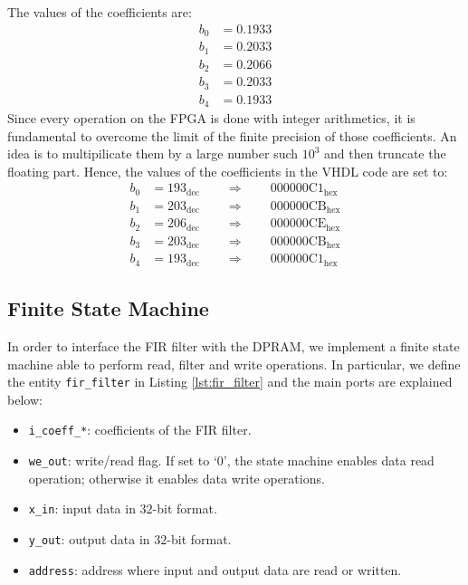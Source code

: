 \documentclass[11pt, a4paper]{article}
\begin{document}
The values of the coefficients are:
\begin{align*}
    b_0 &= 0.1933  \\
    b_1 &= 0.2033  \\
    b_2 &= 0.2066  \\
    b_3 &= 0.2033  \\
    b_4 &= 0.1933
\end{align*}
Since every operation on the FPGA is done with integer arithmetics, it is fundamental to overcome the limit of the finite precision of those coefficients. An idea is to multipilicate them by a large number such $10^3$ and then truncate the floating part. Hence, the values of the coefficients in the VHDL code are set to:
\begin{align*}
    b_0 &= \mathrm{193}_{\text{dec}}  \qquad \Longrightarrow \qquad \mathrm{000000C1}_{\text{hex}}   \\
    b_1 &= \mathrm{203}_{\text{dec}}  \qquad \Longrightarrow \qquad \mathrm{000000CB}_{\text{hex}}   \\
    b_2 &= \mathrm{206}_{\text{dec}}  \qquad \Longrightarrow \qquad \mathrm{000000CE}_{\text{hex}}   \\
    b_3 &= \mathrm{203}_{\text{dec}}  \qquad \Longrightarrow \qquad \mathrm{000000CB}_{\text{hex}}   \\
    b_4 &= \mathrm{193}_{\text{dec}}  \qquad \Longrightarrow \qquad \mathrm{000000C1}_{\text{hex}}
\end{align*}














\subsection{Finite State Machine}
In order to interface the FIR filter with the DPRAM, we implement a finite state machine able to perform read, filter and write operations. In particular, we define the entity {\footnotesize\texttt{fir\_filter}} in Listing \ref{lst:fir_filter} and the main ports are explained below:
\begin{itemize}
    \item {\footnotesize\texttt{i\_coeff\_*}}: coefficients of the FIR filter.
    \item {\footnotesize\texttt{we\_out}}: write/read flag. If set to `0', the state machine enables data read operation; otherwise it enables data write operations.
    \item {\footnotesize\texttt{x\_in}}: input data in \(32\)-bit format.
    \item {\footnotesize\texttt{y\_out}}: output data in \(32\)-bit format.
    \item {\footnotesize\texttt{address}}: address where input and output data are read or written.
\end{itemize}
\end{document}

